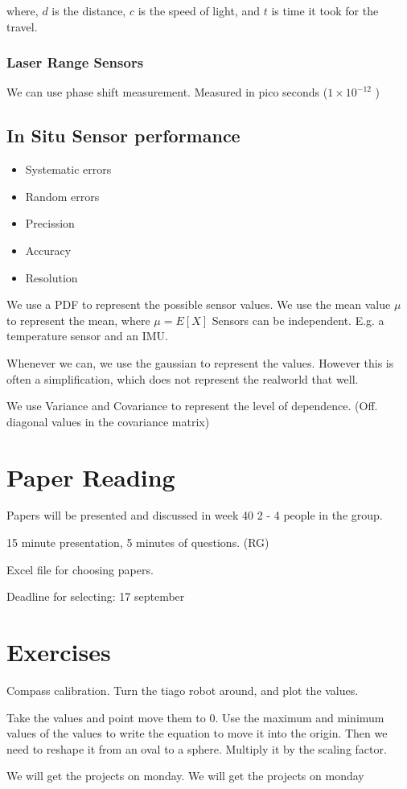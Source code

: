 \documentclass{article}
\begin{document}
where, $d$ is the distance,  $c$ is the speed of light, and $t$ is time it took for the travel.


\subsubsection{Laser Range Sensors}
We can use phase shift measurement. 
Measured in pico seconds ($1 \times 10^{-12}$ )



\subsection{In Situ Sensor performance}
\begin{itemize}
	\item Systematic errors
	\item Random errors
	\item Precission
	\item Accuracy
	\item Resolution
\end{itemize}


We use a PDF to represent the possible sensor values. 
We use the mean value $\mu$ to represent the mean, where  $\mu = E[X]$
Sensors can be independent. E.g. a temperature sensor and an IMU.

Whenever we can, we use the gaussian to represent the values. However this is often a simplification, which does not represent the realworld that well.

We use Variance and Covariance to represent the level of dependence. (Off. diagonal values in the covariance matrix)

\section{Paper Reading}
Papers will be presented and discussed in week 40
2 - 4 people in the group.

15 minute presentation, 5 minutes of questions. (RG)


Excel file for choosing papers. 

Deadline for selecting: 17 september

\section{Exercises}
Compass calibration. Turn the tiago robot around, and plot the values.

Take the values and point move them to 0.
Use the maximum and minimum values of the values to write the equation to move it into the origin. Then we need to reshape it from an oval to a sphere. Multiply it by the scaling factor. 



We will get the projects on monday.
We will get the projects on monday
\end{document}
